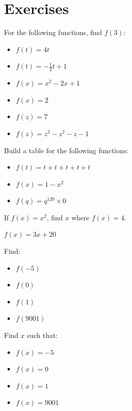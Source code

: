 

\section*{Exercises}

\begin{exercise}
For the following functions, find $f(3)$:

\begin{itemize}
\item $f(t) = 4t$
\item $f(t) = -\frac{1}{2}t + 1$
\item $f(x) = x^2 - 2x + 1$
\item $f(x) = 2$
\item $f(z) = 7$
\item $f(z) = z^3-z^2-z-1$
\end{itemize}

\end{exercise}
\bigskip

\begin{exercise}
Build a table for the following functions:

\begin{itemize}
\item $f(t) = t + t + t + t + t$
\item $f(x) = 1-x^{2}$
\item $f(q) = q^{120}\times 0$
\end{itemize}

\end{exercise}
\bigskip

\begin{exercise}
If $f(x) = x^2$, find $x$ where $f(x) = 4$.
\end{exercise}
\bigskip

\begin{exercise}

	$f(x) = 3x + 20$
	
	Find:
	\begin{itemize}
		\item $f(-5)$
		\item $f(0)$
		\item $f(1)$
		\item $f(9001)$
	\end{itemize}
	
			Find $x$ such that:
	\begin{itemize}
		\item $f(x)=-5$
		\item $f(x)=0$
		\item $f(x)=1$
		\item $f(x)=9001$
	\end{itemize}
\end{exercise}
\bigskip

